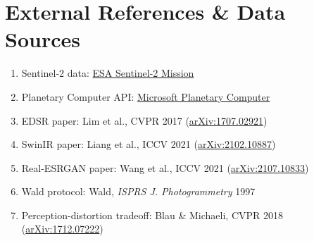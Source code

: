 \section{External References \& Data Sources}

\begin{enumerate}
    \item Sentinel-2 data: \href{https://sentinel.esa.int/web/sentinel/missions/sentinel-2}{ESA Sentinel-2 Mission}
    \item Planetary Computer API: \href{https://planetarycomputer.microsoft.com}{Microsoft Planetary Computer}
    \item EDSR paper: Lim et al., CVPR 2017 (\href{https://arxiv.org/abs/1707.02921}{arXiv:1707.02921})
    \item SwinIR paper: Liang et al., ICCV 2021 (\href{https://arxiv.org/abs/2102.10887}{arXiv:2102.10887})
    \item Real-ESRGAN paper: Wang et al., ICCV 2021 (\href{https://arxiv.org/abs/2107.10833}{arXiv:2107.10833})
    \item Wald protocol: Wald, \emph{ISPRS J. Photogrammetry} 1997
    \item Perception-distortion tradeoff: Blau \& Michaeli, CVPR 2018 (\href{https://arxiv.org/abs/1712.07222}{arXiv:1712.07222})
\end{enumerate}
